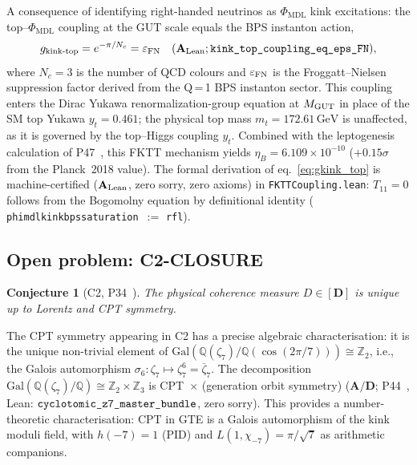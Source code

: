 \documentclass[11pt]{article}
\newtheorem{conjecture}[theorem]{Conjecture}
\theoremstyle{remark}
\newcommand{\PHIMDL}{\Phi_{\mathrm{MDL}}}
\newcommand{\lean}[1]{%
  \penalty-100
  \begingroup\def\_{\textunderscore\allowbreak}\texttt{#1}\endgroup}
\newcommand{\CatAL}{\ensuremath{\textbf{A}_{\rm Lean}}}
\newcommand{\CatAD}{\textbf{A/D}}
\begin{document}
A consequence of identifying right-handed neutrinos as $\PHIMDL$ kink excitations:
the top--$\PHIMDL$ coupling at the GUT scale equals the BPS instanton
action,
\begin{equation}\label{eq:gkink_top}
g_{\rm kink\text{-}top} = e^{-\pi/N_c} = \varepsilon_{\rm FN} \quad (\CatAL; \lean{kink\_top\_coupling\_eq\_eps\_FN}),
\end{equation}
where $N_c = 3$ is the number of QCD colours and $\varepsilon_{\rm FN}$ is
the Froggatt--Nielsen suppression factor derived from the Q\,=\,1 BPS instanton
sector.  This coupling enters the Dirac Yukawa renormalization-group equation
at $M_{\rm GUT}$ in place of the SM top Yukawa $y_t = 0.461$;
the physical top mass $m_t = 172.61\,\text{GeV}$ is unaffected, as it
is governed by the top--Higgs coupling $y_t$.  Combined with the leptogenesis
calculation of P47~\cite{SpivackGTECosmology}, this FKTT mechanism yields
$\eta_B = 6.109\times10^{-10}$ ($+0.15\sigma$ from the Planck~2018 value).
The formal derivation of eq.~\eqref{eq:gkink_top} is machine-certified
(\CatAL, zero sorry, zero axioms) in \lean{FKTTCoupling.lean}:
$T_{11}=0$ follows from the Bogomolny equation by definitional identity
(\lean{phi\_mdl\_kink\_bps\_saturation}\ $:=$ \lean{rfl}).

\subsection{Open problem: C2-CLOSURE}
\label{ssec:c2}

\begin{conjecture}[C2, P34~\cite{SpivackGTEMobius}]
  The physical coherence measure $D\in[\mathbf{D}]$ is unique up to Lorentz
  and CPT symmetry.
\end{conjecture}

The CPT symmetry appearing in C2 has a precise algebraic characterisation: it is the
unique non-trivial element of $\mathrm{Gal}(\mathbb{Q}(\zeta_7)/\mathbb{Q}(\cos(2\pi/7)))
\cong \mathbb{Z}_2$, i.e., the Galois automorphism $\sigma_6: \zeta_7 \mapsto \zeta_7^6
= \overline{\zeta}_7$.  The decomposition $\mathrm{Gal}(\mathbb{Q}(\zeta_7)/\mathbb{Q})
\cong \mathbb{Z}_2 \times \mathbb{Z}_3$ is CPT~$\times$ (generation orbit symmetry)
($\CatAD$; P44~\cite{SpivackQGR}, Lean: $\lean{cyclotomic\_z7\_master\_bundle}$,
zero sorry).  This provides a number-theoretic characterisation: CPT in GTE is a
Galois automorphism of the kink moduli field, with $h(-7)=1$ (PID) and
$L(1,\chi_{-7}) = \pi/\!\sqrt{7}$ as arithmetic companions.
\end{document}
